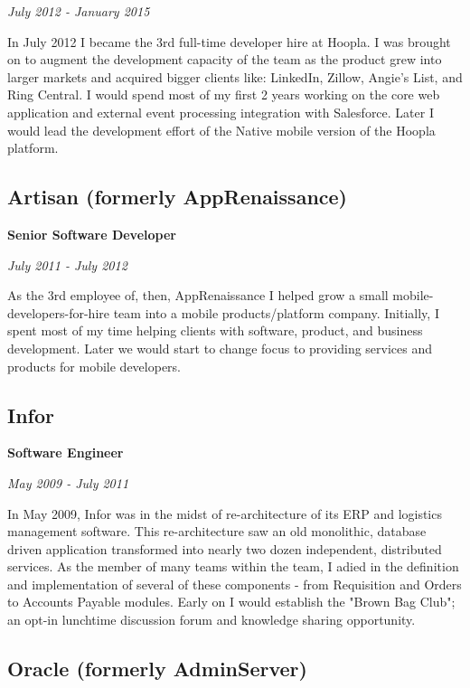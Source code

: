 \documentclass[12pt letterpaper notitlepage]{article}
\begin{document}
\emph{July 2012 - January 2015}

In July 2012 I became the 3rd full-time developer hire at Hoopla. I was brought on to augment the development capacity of the team as the product grew into larger markets and acquired bigger clients like: LinkedIn, Zillow, Angie's List, and Ring Central. I would spend most of my first 2 years working on the core web application and external event processing integration with Salesforce. Later I would lead the development effort of the Native mobile version of the Hoopla platform.

\subsection*{Artisan (formerly AppRenaissance)}
\label{sec:orge31e0aa}

\textbf{Senior Software Developer}

\emph{July 2011 - July 2012}

As the 3rd employee of, then, AppRenaissance I helped grow a small mobile-developers-for-hire team into a mobile products/platform company. Initially, I spent most of my time helping clients with software, product, and business development. Later we would start to change focus to providing services and products for mobile developers.

\subsection*{Infor}
\label{sec:org64c1102}

\textbf{Software Engineer}

\emph{May 2009 - July 2011}

In May 2009, Infor was in the midst of re-architecture of its ERP and logistics management software. This re-architecture saw an old monolithic, database driven application transformed into nearly two dozen independent, distributed services. As the member of many teams within the team, I adied in the definition and implementation of several of these components - from Requisition and Orders to Accounts Payable modules. Early on I would establish the "Brown Bag Club"; an opt-in lunchtime discussion forum and knowledge sharing opportunity.

\subsection*{Oracle (formerly AdminServer)}
\label{sec:org00194cd}
\end{document}
